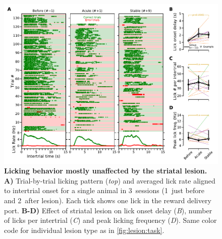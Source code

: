 \begin{figure}[tb!]
    \begin{center}
        \includegraphics[width=\textwidth]{ch-lesion/figures/Lick.pdf}
        \caption[Licking Behavior After Striatal Lesion]
        {\textbf{Licking behavior mostly unaffected by the striatal lesion.}
        \textbf{A)}
        Trial-by-trial licking pattern (\textit{top}) and averaged lick rate aligned to intertrial onset for a single animal in 3~sessions (1~just before and 2~after lesion).
        Each tick shows one lick in the reward delivery port.
        \textbf{B-D)}
        Effect of striatal lesion on lick onset delay (\textit{B}), number of licks per intertrial (\textit{C}) and peak licking frequency (\textit{D}).
        Same color code for individual lesion type as in \autoref{fig:lesion:task}.
        }
        \label{fig:lesion:lick}
    \end{center}
\end{figure}